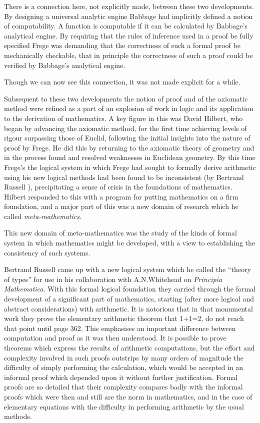 There is a connection here, not explicitly made, between these two
developments.
By designing a universal analytic engine Babbage had implicitly
defined a notion of computability.
A function is computable if it can be calculated by Babbage's
analytical engine.
By requiring that the rules of inference used in a proof be fully
specified Frege was demanding that the correctness of such a formal
proof be mechanically checkable, that in principle the correctness of
such a proof could be verified by Babbage's analytical engine.

Though we can now see this connection, it was not made explicit for a
while.

Subsequent to these two developments the notion of proof and of the
axiomatic method were refined as a part of an explosion of work in
logic and its application to the derivation of mathematics.
A key figure in this was David Hilbert, who began by advancing the
axiomatic method, for the first time achieving levels of rigour
surpassing those of Euclid, following the initial insights into the
nature of proof by Frege.
He did this by returning to the axiomatic theory of geometry and in
the process found and resolved weaknesses in Euclidean geometry.
By this time Frege's the logical system in which Frege had sought to
formally derive arithmetic using his new logical methods had been
found to be inconsistent (by Bertrand Russell ),
 precipitating a sense of crisis in the foundations of mathematics.
Hilbert responded to this with a program for putting mathematics on
a firm foundation, and a major part of this was a new domain of
research which he called
\emph{meta-mathematics}.

This new domain of meta-mathematics was the study of the kinds of
formal system in which mathematics might be developed, with a view to
establishing the consistency of such systems.

Bertrand Russell came up with a new logical system which he called the
``theory of types'' for use in his collaboration with A.N.Whitehead on
\emph{Principia Mathematica}.
With this formal logical foundation they carried through the
formal development of a significant part of mathematics, starting
(after more logical and abstract considerations) with arithmetic.
It is notorious that in that monumental work they prove the elementary
arithmetic theorem that 1+1=2, do not reach that point until page 362.
This emphasises an important difference between computation and proof
as it was then understood.
It is possible to prove theorems which express the results of
arithmetic computations, but the effort and complexity involved in
such proofs outstrips by many orders of magnitude the difficulty of
simply performing the calculation, which would be accepted in an
informal proof which depended upon it without further justification.
Formal proofs are so detailed that their complexity compares badly
with the informal proofs which were then and still are the norm in
mathematics, and in the case of elementary equations with the
difficulty in performing arithmetic by the usual methods.

